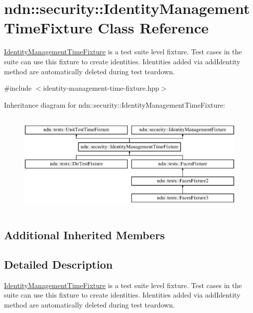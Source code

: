 \hypertarget{classndn_1_1security_1_1IdentityManagementTimeFixture}{}\section{ndn\+:\+:security\+:\+:Identity\+Management\+Time\+Fixture Class Reference}
\label{classndn_1_1security_1_1IdentityManagementTimeFixture}


\hyperlink{classndn_1_1security_1_1IdentityManagementTimeFixture}{Identity\+Management\+Time\+Fixture} is a test suite level fixture. Test cases in the suite can use this fixture to create identities. Identities added via add\+Identity method are automatically deleted during test teardown.  




{\ttfamily \#include $<$identity-\/management-\/time-\/fixture.\+hpp$>$}

Inheritance diagram for ndn\+:\+:security\+:\+:Identity\+Management\+Time\+Fixture\+:\begin{figure}[H]
\begin{center}
\leavevmode
\includegraphics[height=5.000000cm]{classndn_1_1security_1_1IdentityManagementTimeFixture}
\end{center}
\end{figure}
\subsection*{Additional Inherited Members}


\subsection{Detailed Description}
\hyperlink{classndn_1_1security_1_1IdentityManagementTimeFixture}{Identity\+Management\+Time\+Fixture} is a test suite level fixture. Test cases in the suite can use this fixture to create identities. Identities added via add\+Identity method are automatically deleted during test teardown. 

